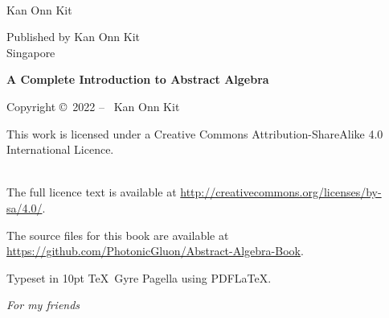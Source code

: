 {\begin{titlepage}
\begin{raggedleft}
            \vspace{0.5cm}
            {\fontsize{16pt}{0pt}\selectfont \editiontext}\\

            \vspace{1.25cm}
            {\fontsize{20pt}{0pt}\selectfont Kan Onn Kit}\\
        \end{raggedleft}
        \vspace*{\fill}
    \end{titlepage}
}

\newpage{}

\clearpage\null\vfill
\thispagestyle{empty}
\begin{minipage}[b]{0.9\textwidth}
    \footnotesize\raggedright
    \setlength{\parskip}{0.5\baselineskip}

    Published by Kan Onn Kit\\
    Singapore
    \vspace{5cm}

    \textbf{A Complete Introduction to Abstract Algebra}\par
    \editiontext
    \vspace{0.3cm}

    Copyright \copyright \ 2022 -- \the\year\ Kan Onn Kit\par
    This work is licensed under a Creative Commons Attribution-ShareAlike 4.0 International Licence.\par
    \\
    The full licence text is available at \url{http://creativecommons.org/licenses/by-sa/4.0/}.\par
    The source files for this book are available at \url{https://github.com/PhotonicGluon/Abstract-Algebra-Book}.
    \vspace{0.3cm}

    Typeset in 10pt \TeX~Gyre Pagella using PDF\LaTeX.
\end{minipage}

\vspace*{2\baselineskip}
\cleardoublepage

\thispagestyle{empty}
\vspace*{1cm}

\begin{center}
    {\fontsize{18pt}{0}\selectfont \textit{For my friends}}\\
\end{center}

